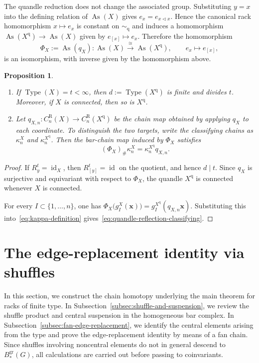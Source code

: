 \documentclass[11pt]{article}
\newtheorem{proposition}[theorem]{Proposition}
\DeclareMathOperator{\As}{As}
\DeclareMathOperator{\Type}{Type}
\newcommand{\gr}{\mathrm{gr}}
\newcommand{\R}{\mathrm R}
\begin{document}
The quandle reduction does not change the associated group. Substituting $y=x$ into the defining relation of $\As(X)$ gives $e_x=e_{x\lhd x}$. Hence the canonical rack homomorphism $x\mapsto e_x$ is constant on $\sim_{\mathrm q}$ and induces a homomorphism $\As(X^{\mathrm q})\to\As(X)$ given by $e_{[x]}\mapsto e_x$. Therefore the homomorphism
\[
 \Phi_X:=\As(q_X)\colon
 \As(X)\xrightarrow{\cong}\As(X^{\mathrm q}),
 \qquad e_x\longmapsto e_{[x]},
\]
is an isomorphism, with inverse given by the homomorphism above.

\begin{proposition}%
\label{prop:quandle-reflection}
\begin{enumerate}[label=(\arabic*)]
\item If $\Type(X)=t<\infty$, then $d:=\Type(X^{\mathrm q})$ is finite and divides $t$. Moreover, if $X$ is connected, then so is $X^{\mathrm q}$.
\item Let $q_{X,n}\colon C_n^\R(X)\to C_n^\R(X^{\mathrm q})$ be the chain map obtained by applying $q_X$ to each coordinate. To distinguish the two targets, write the classifying chains as $\kappa_n^X$ and $\kappa_n^{X^{\mathrm q}}$. Then the bar-chain map induced by $\Phi_X$ satisfies
\begin{equation}
 (\Phi_X)_\#\kappa_n^X
 =\kappa_n^{X^{\mathrm q}}q_{X,n}.
 \label{eq:quandle-reflection-classifying}
\end{equation}
\end{enumerate}
\end{proposition}

\begin{proof}
If $R_y^t=\operatorname{id}_X$, then $R_{[y]}^t=\operatorname{id}$ on the quotient, and hence $d\mid t$. Since $q_X$ is surjective and equivariant with respect to $\Phi_X$, the quandle $X^{\mathrm q}$ is connected whenever $X$ is connected.

For every $I\subset\{1,\ldots,n\}$, one has $\Phi_X\bigl(g_I^X(\mathbf x)\bigr)=g_I^{X^{\mathrm q}}(q_{X,n}\mathbf x)$. Substituting this into~\eqref{eq:kappa-definition} gives~\eqref{eq:quandle-reflection-classifying}.
\end{proof}

\section{The edge-replacement identity via shuffles}

In this section, we construct the chain homotopy underlying the main theorem for racks of finite type. In Subsection~\ref{subsec:shuffle-and-suspension}, we review the shuffle product and central suspension in the homogeneous bar complex. In Subsection~\ref{subsec:fan-edge-replacement}, we identify the central elements arising from the type and prove the edge-replacement identity by means of a fan chain. Since shuffles involving noncentral elements do not in general descend to $B_*^{\gr}(G)$, all calculations are carried out before passing to coinvariants.
\end{document}
